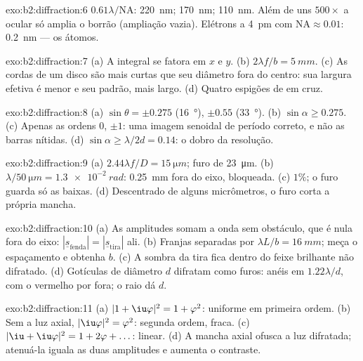 \begin{solution}{exo:b2:diffraction:6}
$0.61\lambda/\mathrm{NA}$: \qty{220}{nm}; \qty{170}{nm}; \qty{110}{nm}. Além de uns $500\times$
a ocular só amplia o borrão (ampliação vazia). Elétrons
a \qty{4}{pm} com $\mathrm{NA} \approx 0.01$: \qty{0.2}{nm} --- os átomos.
\end{solution}

\begin{solution}{exo:b2:diffraction:7}
(a) A integral se fatora em $x$ e $y$. (b) $2\lambda f/b = \qty{5}{mm}$. (c) As
cordas de um disco são mais curtas que seu diâmetro fora do centro: sua
largura efetiva é menor e seu padrão, mais largo. (d) Quatro espigões de
 em cruz.
\end{solution}

\begin{solution}{exo:b2:diffraction:8}
(a) $\sin\theta = \pm0.275$ (\qty{16}{\degree}), $\pm0.55$ (\qty{33}{\degree}). (b) $\sin\alpha \ge 0.275$.
(c) Apenas as ordens $0$, $\pm1$: uma imagem senoidal de período correto, e não
as barras nítidas. (d) $\sin\alpha \ge \lambda/2d = 0.14$: o dobro da resolução.
\end{solution}

\begin{solution}{exo:b2:diffraction:9}
(a) $2.44\lambda f/D = \qty{15}{\micro m}$; furo de \qty{23}{\micro m}. (b) $\lambda/\qty{50}{\micro m} =
\qty{1.3e-2}{rad}$: \qty{0.25}{mm} fora do eixo, bloqueada. (c) $1\%$; o furo guarda só
as  baixas. (d) Descentrado de alguns micrômetros, o
furo corta a própria mancha.
\end{solution}

\begin{solution}{exo:b2:diffraction:10}
(a) As amplitudes somam a onda sem obstáculo, que é nula fora do eixo:
$|\underline s_{\text{fenda}}| = |\underline s_{\text{tira}}|$ ali. (b) Franjas separadas por $\lambda L/b =
\qty{16}{mm}$; meça o espaçamento e obtenha $b$. (c) A sombra da tira fica
dentro do feixe brilhante não difratado. (d) Gotículas de diâmetro $d$ difratam
como furos: anéis em $1.22\lambda/d$, com o vermelho por fora; o raio dá $d$.
\end{solution}

\begin{solution}{exo:b2:diffraction:11}
(a) $|1 + \iu\varphi|^2 = 1 + \varphi^2$: uniforme em primeira ordem. (b) Sem a
luz axial, $|\iu\varphi|^2 = \varphi^2$: segunda ordem, fraca. (c) $|\iu + \iu\varphi|^2 =
1 + 2\varphi + \dots$: linear. (d) A mancha axial ofusca a luz
difratada; atenuá-la iguala as duas amplitudes e aumenta o contraste.
\end{solution}

